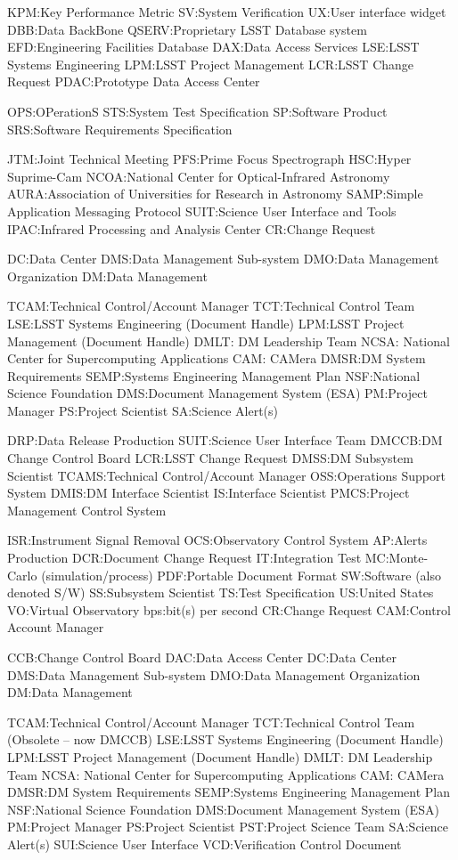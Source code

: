 KPM:Key Performance Metric
SV:System Verification
UX:User interface widget
DBB:Data BackBone
QSERV:Proprietary LSST Database system
EFD:Engineering Facilities Database
DAX:Data Access Services
LSE:LSST Systems Engineering
LPM:LSST Project Management
LCR:LSST Change Request
PDAC:Prototype Data Access Center

OPS:OPerationS
STS:System Test Specification
SP:Software Product
SRS:Software Requirements Specification

JTM:Joint Technical Meeting
PFS:Prime Focus Spectrograph
HSC:Hyper Suprime-Cam
NCOA:National Center for Optical-Infrared Astronomy
AURA:Association of Universities for Research in Astronomy
SAMP:Simple Application Messaging Protocol
SUIT:Science User Interface and Tools
IPAC:Infrared Processing and Analysis Center
CR:Change Request

DC:Data Center
DMS:Data Management Sub-system
DMO:Data Management Organization
DM:Data Management

TCAM:Technical Control/Account Manager
TCT:Technical Control Team
LSE:LSST Systems Engineering (Document Handle)
LPM:LSST Project Management (Document Handle)
DMLT: DM Leadership Team
NCSA: National Center for Supercomputing Applications
CAM: CAMera
DMSR:DM System Requirements
SEMP:Systems Engineering Management Plan
NSF:National Science Foundation
DMS:Document Management System (ESA)
PM:Project Manager
PS:Project Scientist
SA:Science Alert(s)

DRP:Data Release Production
SUIT:Science User Interface Team
DMCCB:DM Change Control Board
LCR:LSST Change Request
DMSS:DM Subsystem Scientist
TCAMS:Technical Control/Account Manager
OSS:Operations Support System
DMIS:DM Interface Scientist
IS:Interface Scientist
PMCS:Project Management Control System

ISR:Instrument Signal Removal
OCS:Observatory Control System
AP:Alerts Production
DCR:Document Change Request
IT:Integration Test
MC:Monte-Carlo (simulation/process)
PDF:Portable Document Format
SW:Software (also denoted S/W)
SS:Subsystem Scientist
TS:Test Specification
US:United States
VO:Virtual Observatory
bps:bit(s) per second
CR:Change Request
CAM:Control Account Manager

CCB:Change Control Board
DAC:Data Access Center
DC:Data Center
DMS:Data Management Sub-system
DMO:Data Management Organization
DM:Data Management

TCAM:Technical Control/Account Manager
TCT:Technical Control Team (Obsolete -- now DMCCB)
LSE:LSST Systems Engineering (Document Handle)
LPM:LSST Project Management (Document Handle)
DMLT: DM Leadership Team
NCSA: National Center for Supercomputing Applications
CAM: CAMera
DMSR:DM System Requirements
SEMP:Systems Engineering Management Plan
NSF:National Science Foundation
DMS:Document Management System (ESA)
PM:Project Manager
PS:Project Scientist
PST:Project Science Team
SA:Science Alert(s)
SUI:Science User Interface
VCD:Verification Control Document

